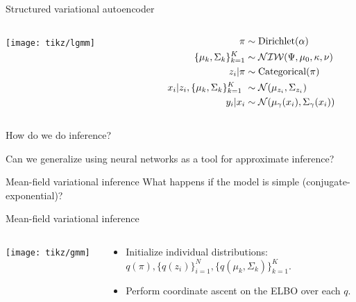 \documentclass[10pt, compress]{beamer}
\begin{document}
\begin{frame}{Structured variational autoencoder}
  \centering
  \begin{columns}
    \begin{column}{0.3\textwidth}
      \texttt{[image: tikz/lgmm]}
    \end{column}
    \begin{column}{0.3\textwidth}
      \begin{align*}
        \pi &\sim \textrm{Dirichlet}(\alpha) \\
        \{\mu_k, \Sigma_k\}_{k = 1}^K &\sim \mathcal{NIW}(\Psi, \mu_0, \kappa, \nu) \\
        z_i | \pi &\sim \textrm{Categorical}(\pi) \\
        x_i | z_i, \{\mu_k, \Sigma_k\}_{k = 1}^K \ &\sim \mathcal{N}(\mu_{z_i}, \Sigma_{z_i}) \\
        y_i | x_i &\sim \mathcal{N}(\mu_\gamma(x_i), \Sigma_\gamma(x_i))
      \end{align*}
    \end{column}
  \end{columns}
  \pause
  How do we do inference?
\end{frame}

\begin{frame}[standout]
  \centering
  Can we generalize using neural networks as a tool
  for approximate inference?
\end{frame}

\begin{frame}{Mean-field variational inference}
  \centering
  What happens if the model is simple (conjugate-exponential)? 
  
  \pause Mean-field variational inference
  
  \begin{columns}
    \begin{column}{0.3\textwidth}
      \texttt{[image: tikz/gmm]}
    \end{column}
    \begin{column}{0.5\textwidth}
        \begin{itemize}
            \item Initialize individual distributions: \\ $q(\pi), \{q(z_i)\}_{i = 1}^N,
            \{q(\mu_k, \Sigma_k)\}_{k = 1}^K$.
            \item Perform coordinate ascent on the ELBO over each $q$.
        \end{itemize}
    \end{column}
  \end{columns}
\end{frame}
\end{document}
